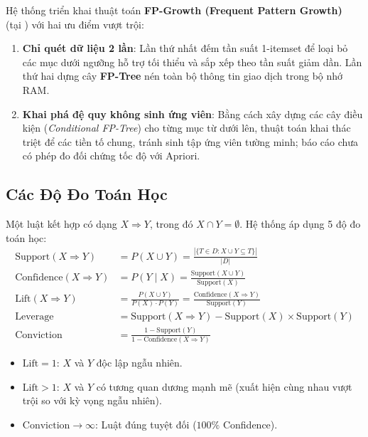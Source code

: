 Hệ thống triển khai thuật toán \textbf{FP-Growth (Frequent Pattern Growth)}~\cite{han2000mining} (tại ) với hai ưu điểm vượt trội:
\begin{enumerate}[label=\arabic*.]
  \item \textbf{Chỉ quét dữ liệu 2 lần}: Lần thứ nhất đếm tần suất 1-itemset để loại bỏ các mục dưới ngưỡng hỗ trợ tối thiểu và sắp xếp theo tần suất giảm dần. Lần thứ hai dựng cây \textbf{FP-Tree} nén toàn bộ thông tin giao dịch trong bộ nhớ RAM.
  \item \textbf{Khai phá đệ quy không sinh ứng viên}: Bằng cách xây dựng các cây điều kiện (\textit{Conditional FP-Tree}) cho từng mục từ dưới lên, thuật toán khai thác triệt để các tiền tố chung, tránh sinh tập ứng viên tường minh; báo cáo chưa có phép đo đối chứng tốc độ với Apriori.
\end{enumerate}

\subsection{Các Độ Đo Toán Học}
Một luật kết hợp có dạng $X \Rightarrow Y$, trong đó $X \cap Y = \emptyset$. Hệ thống áp dụng 5 độ đo toán học:
\begin{align}
  \text{Support}(X \Rightarrow Y) &= P(X \cup Y) = \frac{|\{T \in D : X \cup Y \subseteq T\}|}{|D|} \\
  \text{Confidence}(X \Rightarrow Y) &= P(Y \mid X) = \frac{\text{Support}(X \cup Y)}{\text{Support}(X)} \\
  \text{Lift}(X \Rightarrow Y) &= \frac{P(X \cup Y)}{P(X) \cdot P(Y)} = \frac{\text{Confidence}(X \Rightarrow Y)}{\text{Support}(Y)} \\
  \text{Leverage} &= \text{Support}(X \Rightarrow Y) - \text{Support}(X) \times \text{Support}(Y) \\
  \text{Conviction} &= \frac{1 - \text{Support}(Y)}{1 - \text{Confidence}(X \Rightarrow Y)}
\end{align}

\begin{itemize}
  \item $\text{Lift} = 1$: $X$ và $Y$ độc lập ngẫu nhiên.
  \item $\text{Lift} > 1$: $X$ và $Y$ có tương quan dương mạnh mẽ (xuất hiện cùng nhau vượt trội so với kỳ vọng ngẫu nhiên).
  \item $\text{Conviction} \to \infty$: Luật đúng tuyệt đối ($100\%$ Confidence).
\end{itemize}

